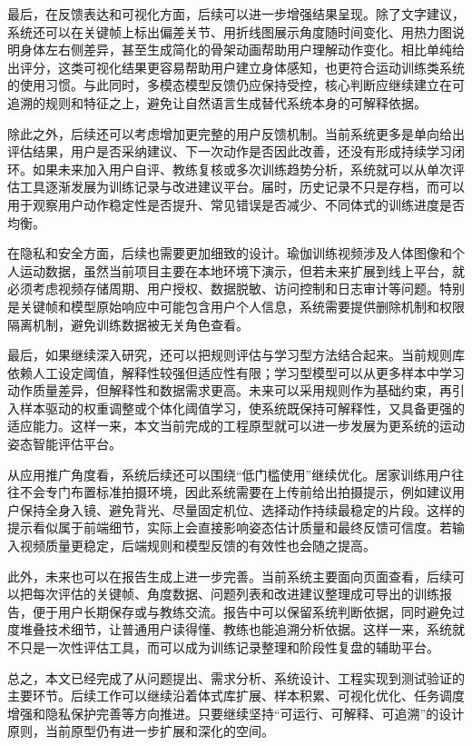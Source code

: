 最后，在反馈表达和可视化方面，后续可以进一步增强结果呈现。除了文字建议，系统还可以在关键帧上标出偏差关节、用折线图展示角度随时间变化、用热力图说明身体左右侧差异，甚至生成简化的骨架动画帮助用户理解动作变化。相比单纯给出评分，这类可视化结果更容易帮助用户建立身体感知，也更符合运动训练类系统的使用习惯。与此同时，多模态模型反馈仍应保持受控，核心判断应继续建立在可追溯的规则和特征之上，避免让自然语言生成替代系统本身的可解释依据。

除此之外，后续还可以考虑增加更完整的用户反馈机制。当前系统更多是单向给出评估结果，用户是否采纳建议、下一次动作是否因此改善，还没有形成持续学习闭环。如果未来加入用户自评、教练复核或多次训练趋势分析，系统就可以从单次评估工具逐渐发展为训练记录与改进建议平台。届时，历史记录不只是存档，而可以用于观察用户动作稳定性是否提升、常见错误是否减少、不同体式的训练进度是否均衡。

在隐私和安全方面，后续也需要更加细致的设计。瑜伽训练视频涉及人体图像和个人运动数据，虽然当前项目主要在本地环境下演示，但若未来扩展到线上平台，就必须考虑视频存储周期、用户授权、数据脱敏、访问控制和日志审计等问题。特别是关键帧和模型原始响应中可能包含用户个人信息，系统需要提供删除机制和权限隔离机制，避免训练数据被无关角色查看。

最后，如果继续深入研究，还可以把规则评估与学习型方法结合起来。当前规则库依赖人工设定阈值，解释性较强但适应性有限；学习型模型可以从更多样本中学习动作质量差异，但解释性和数据需求更高。未来可以采用规则作为基础约束，再引入样本驱动的权重调整或个体化阈值学习，使系统既保持可解释性，又具备更强的适应能力。这样一来，本文当前完成的工程原型就可以进一步发展为更系统的运动姿态智能评估平台。

从应用推广角度看，系统后续还可以围绕“低门槛使用”继续优化。居家训练用户往往不会专门布置标准拍摄环境，因此系统需要在上传前给出拍摄提示，例如建议用户保持全身入镜、避免背光、尽量固定机位、选择动作持续最稳定的片段。这样的提示看似属于前端细节，实际上会直接影响姿态估计质量和最终反馈可信度。若输入视频质量更稳定，后端规则和模型反馈的有效性也会随之提高。

此外，未来也可以在报告生成上进一步完善。当前系统主要面向页面查看，后续可以把每次评估的关键帧、角度数据、问题列表和改进建议整理成可导出的训练报告，便于用户长期保存或与教练交流。报告中可以保留系统判断依据，同时避免过度堆叠技术细节，让普通用户读得懂、教练也能追溯分析依据。这样一来，系统就不只是一次性评估工具，而可以成为训练记录整理和阶段性复盘的辅助平台。

总之，本文已经完成了从问题提出、需求分析、系统设计、工程实现到测试验证的主要环节。后续工作可以继续沿着体式库扩展、样本积累、可视化优化、任务调度增强和隐私保护完善等方向推进。只要继续坚持“可运行、可解释、可追溯”的设计原则，当前原型仍有进一步扩展和深化的空间。

